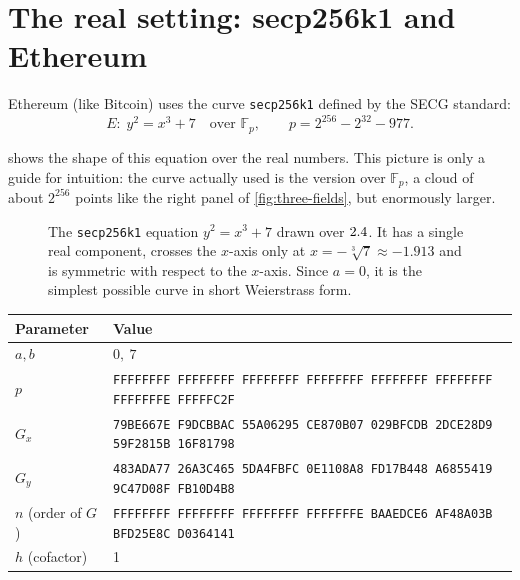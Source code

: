 \section{The real setting: secp256k1 and Ethereum}

Ethereum (like Bitcoin) uses the curve \texttt{secp256k1} defined by the SECG standard:
\[
  E:\; y^2 = x^3 + 7 \quad \text{over } \mathbb{F}_p, \qquad p = 2^{256} - 2^{32} - 977 .
\]

 shows the shape of this equation over the real numbers. This picture is only a guide for intuition: the curve actually used is the version over $\mathbb{F}_p$, a cloud of about $2^{256}$ points like the right panel of \cref{fig:three-fields}, but enormously larger.

\begin{figure}[H]
  \centering
  \caption{The \texttt{secp256k1} equation $y^2 = x^3 + 7$ drawn over $2.4$. It has a single real component, crosses the $x$-axis only at $x = -\sqrt[3]{7} \approx -1.913$ and is symmetric with respect to the $x$-axis. Since $a = 0$, it is the simplest possible curve in short Weierstrass form.}
  \label{fig:secp256k1}
\end{figure}

\begin{center}
  \footnotesize
  \begin{tabular}{l l}
    \toprule
    Parameter & Value \\
    \midrule
    $a, b$ & $0,\ 7$ \\
    $p$ & \texttt{FFFFFFFF FFFFFFFF FFFFFFFF FFFFFFFF FFFFFFFF FFFFFFFF FFFFFFFE FFFFFC2F} \\
    $G_x$ & \texttt{79BE667E F9DCBBAC 55A06295 CE870B07 029BFCDB 2DCE28D9 59F2815B 16F81798} \\
    $G_y$ & \texttt{483ADA77 26A3C465 5DA4FBFC 0E1108A8 FD17B448 A6855419 9C47D08F FB10D4B8} \\
    $n$ (order of $G$) & \texttt{FFFFFFFF FFFFFFFF FFFFFFFF FFFFFFFE BAAEDCE6 AF48A03B BFD25E8C D0364141} \\
    $h$ (cofactor) & 1 \\
    \bottomrule
  \end{tabular}
\end{center}


